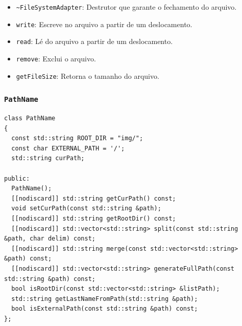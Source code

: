 \documentclass[
    12pt,				%
    oneside,   	        %
    a4paper,			%
    english,			%
    french,				%
    spanish,			%
    brazil,				%
    ]{pacotes/abntex2}
\begin{document}
\begin{itemize}
\begin{itemize}
            \item \texttt{\textasciitilde FileSystemAdapter}: Destrutor que garante o fechamento do arquivo.
            
            \item \texttt{write}: Escreve no arquivo a partir de um deslocamento.
            \item \texttt{read}: L\'e do arquivo a partir de um deslocamento.
            \item \texttt{remove}: Exclui o arquivo.
            \item \texttt{getFileSize}: Retorna o tamanho do arquivo.
        \end{itemize}
\end{itemize}

\subsubsection{\texttt{PathName}}
\label{subsubsec:path_name}

\begin{lstlisting}[caption={Classe para manipulação de caminhos no sistema}, label={lst:pathname}]
class PathName
{
  const std::string ROOT_DIR = "img/";
  const char EXTERNAL_PATH = '/';
  std::string curPath;

public:
  PathName();
  [[nodiscard]] std::string getCurPath() const;
  void setCurPath(const std::string &path);
  [[nodiscard]] std::string getRootDir() const;
  [[nodiscard]] std::vector<std::string> split(const std::string &path, char delim) const;
  [[nodiscard]] std::string merge(const std::vector<std::string> &path) const;
  [[nodiscard]] std::vector<std::string> generateFullPath(const std::string &path) const;
  bool isRootDir(const std::vector<std::string> &listPath);
  std::string getLastNameFromPath(std::string &path);
  bool isExternalPath(const std::string &path) const;
};
\end{lstlisting}
\end{document}
